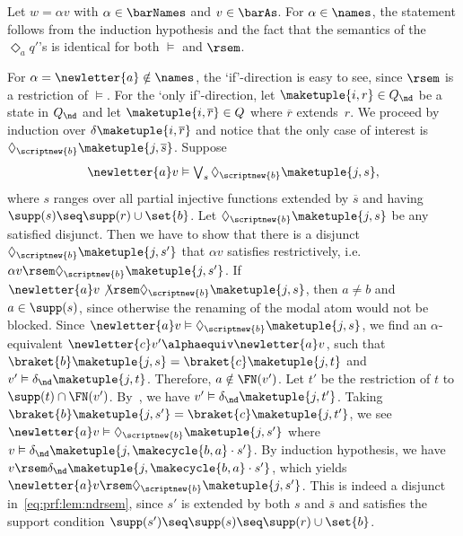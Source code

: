 \documentclass[10pt, final, conference, a4paper, twocolumn]{IEEEtran}
\renewcommand{\enquote}[1]{`#1'}
\begin{document}
  Let $w = \alpha v$ with $\alpha \in \barNames$ and $v \in \barAs$. For $\alpha \in \names$, the statement follows
  from the induction hypothesis and the fact that the semantics of the $\Diamond_a q'$'s is identical for
  both $\vDash$ and $\rsem$.

  For $\alpha = \newletter{a} \notin\names$,
  the \enquote{if}-direction is easy to see, since $\rsem$ is a restriction of $\vDash$.
  For the \enquote{only if}-direction, let $\maketuple{i, r} \in Q_{\nd}$ be a state in $Q_{\nd}$ and let $\maketuple{i, \overline{r}}
  \in Q$ where $\overline{r}$ extends~$r$. We proceed by induction over $\delta\maketuple{i, \overline{r}}$ and notice that the
  only case of interest is $\Diamond_{\scriptnew{b}} \maketuple{j, \overline{s}}$.
  Suppose 
  \begin{equation}\label{eq:prf:lem:ndrsem}
    \newletter{a} v
    \vDash
    \textstyle\bigvee_s \Diamond_{\scriptnew{b}} \maketuple{j, s},
  \end{equation}
  where $s$ ranges over all partial injective functions extended by $\overline{s}$ and having $\supp(s) \seq \supp(r) \cup \set{b}$.
  Let $\Diamond_{\scriptnew{b}} \maketuple{j, s}$ be any satisfied disjunct.
  Then we have to show that there is a disjunct $\Diamond_{\scriptnew{b}} \maketuple{j, s'}$ that $\alpha v$ satisfies restrictively, i.e.~$\alpha v \rsem \Diamond_{\scriptnew{b}} \maketuple{j, s'}$.
  If $\newletter{a} v \not\rsem \Diamond_{\scriptnew{b}} \maketuple{j, s}$, then $a \neq b$ and
  $a \in \supp(s)$, since otherwise the renaming of the modal atom would not be blocked.
  Since $\newletter{a} v \vDash \Diamond_{\scriptnew{b}} \maketuple{j, s}$, we find an $\alpha$-equivalent
  $\newletter{c}v' \alphaequiv \newletter{a} v$, such that $\braket{b}\maketuple{j, s} = \braket{c}\maketuple{j, t}$
  and $v' \vDash \delta_{\nd}\maketuple{j, t}$. Therefore, $a \notin \FN(v')$. Let $t'$ be the restriction of $t$ to $\supp(t) \cap \FN(v')$.
  By~, we have $v' \vDash \delta_{\nd}\maketuple{j, t'}$.
  Taking $\braket{b}\maketuple{j, s'} = \braket{c}\maketuple{j, t'}$, we see $\newletter{a} v \vDash \Diamond_{\scriptnew{b}}
  \maketuple{j, s'}$ where $v \vDash \delta_{\nd}\maketuple{j, \makecycle{b, a}\cdot s'}$. By induction hypothesis, we have $v \rsem \delta_{\nd}\maketuple{j,
  \makecycle{b, a}\cdot s'}$, which yields $\newletter{a} v \rsem \Diamond_{\scriptnew{b}}\maketuple{j, s'}$.
  This is indeed a disjunct in~\eqref{eq:prf:lem:ndrsem}, since $s'$ is extended by both $s$ and $\overline{s}$ and satisfies the
  support condition $\supp(s') \seq \supp(s) \seq \supp(r) \cup \set{b}$.
\end{document}
